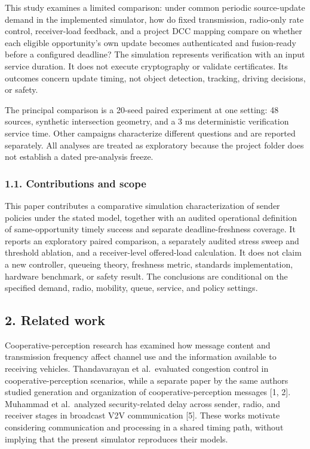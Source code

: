 \documentclass[
]{article}
\begin{document}
This study examines a limited comparison: under common periodic
source-update demand in the implemented simulator, how do fixed
transmission, radio-only rate control, receiver-load feedback, and a
project DCC mapping compare on whether each eligible opportunity's own
update becomes authenticated and fusion-ready before a configured
deadline? The simulation represents verification with an input service
duration. It does not execute cryptography or validate certificates. Its
outcomes concern update timing, not object detection, tracking, driving
decisions, or safety.

The principal comparison is a 20-seed paired experiment at one setting:
48 sources, synthetic intersection geometry, and a 3 ms deterministic
verification service time. Other campaigns characterize different
questions and are reported separately. All analyses are treated as
exploratory because the project folder does not establish a dated
pre-analysis freeze.

\subsubsection{1.1. Contributions and
scope}\label{contributions-and-scope}

This paper contributes a comparative simulation characterization of
sender policies under the stated model, together with an audited
operational definition of same-opportunity timely success and separate
deadline-freshness coverage. It reports an exploratory paired
comparison, a separately audited stress sweep and threshold ablation,
and a receiver-level offered-load calculation. It does not claim a new
controller, queueing theory, freshness metric, standards implementation,
hardware benchmark, or safety result. The conclusions are conditional on
the specified demand, radio, mobility, queue, service, and policy
settings.

\subsection{2. Related work}\label{related-work}

Cooperative-perception research has examined how message content and
transmission frequency affect channel use and the information available
to receiving vehicles. Thandavarayan et al.~evaluated congestion control
in cooperative-perception scenarios, while a separate paper by the same
authors studied generation and organization of cooperative-perception
messages {[}1, 2{]}. Muhammad et al.~analyzed security-related delay
across sender, radio, and receiver stages in broadcast V2V communication
{[}5{]}. These works motivate considering communication and processing
in a shared timing path, without implying that the present simulator
reproduces their models.
\end{document}
